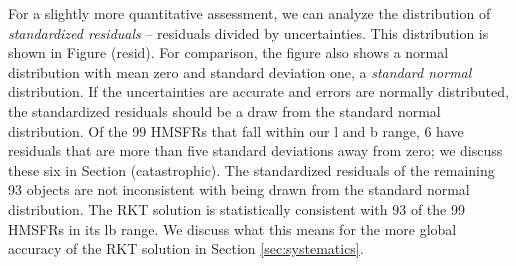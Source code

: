 For a slightly more quantitative assessment, we can analyze the distribution of \emph{standardized residuals} -- residuals divided by uncertainties. This distribution is shown in Figure (resid). For comparison, the figure also shows a normal distribution with mean zero and standard deviation one, a \emph{standard normal} distribution. If the uncertainties are accurate and errors are normally distributed, the standardized residuals should be a draw from the standard normal distribution. Of the 99 HMSFRs that fall within our l and b range, 6 have residuals that are more than five standard deviations away from zero; we discuss these six in Section (catastrophic). The standardized residuals of the remaining 93 objects are not inconsistent with being drawn from the standard normal distribution. The RKT solution is statistically consistent with 93 of the 99 HMSFRs in its lb range. We discuss what this means for the more global accuracy of the RKT solution in Section \ref{sec:systematics}. 